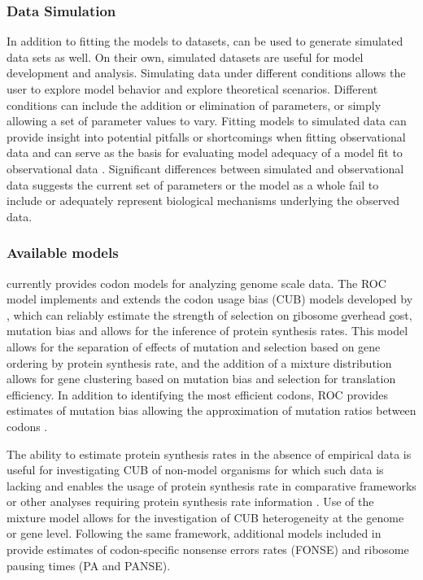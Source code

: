 \subsubsection{Data Simulation}
In addition to fitting the models to datasets, \package can be used to generate simulated data sets as well.
On their own, simulated datasets are useful for model development and analysis.
Simulating data under different conditions allows the user to explore model behavior and explore theoretical scenarios. 
Different conditions can include the addition or elimination of parameters, or simply allowing a set of parameter values to vary.
Fitting models to simulated data can provide insight into potential pitfalls or shortcomings when fitting observational data and can serve as the basis for evaluating model adequacy of a model fit to observational data \citep{gumi2015}.
Significant differences between simulated and observational data suggests the current set of parameters or the model as a whole fail to include or adequately represent biological mechanisms underlying the observed data.
 
\subsubsection{Available models}
\package currently provides codon models for analyzing genome scale data.
The ROC model implements and extends the codon usage bias (CUB) models developed by \citet{gilchrist2015,wallace2013,shah2011}, which can reliably estimate the strength of selection on \underline{r}ibosome \underline{o}verhead \underline{c}ost, mutation bias and allows for the inference of protein synthesis rates.
This model allows for the separation of effects of mutation and selection based on gene ordering by protein synthesis rate, and the addition of a mixture distribution allows for gene clustering based on mutation bias and selection for translation efficiency.
In addition to identifying the most efficient codons, ROC provides estimates of mutation bias allowing the approximation of mutation ratios between codons \citep{gilchrist2015,wallace2013}.

The ability to estimate protein synthesis rates in the absence of empirical data is useful for investigating CUB of non-model organisms for which such data is lacking and enables the usage of protein synthesis rate in comparative frameworks or other analyses requiring protein synthesis rate information \citep{dunn2018}.
Use of the mixture model allows for the investigation of CUB heterogeneity at the genome or gene level.  
Following the same framework, additional models included in \package provide estimates of codon-specific nonsense errors rates (FONSE) and ribosome pausing times (PA and PANSE).

